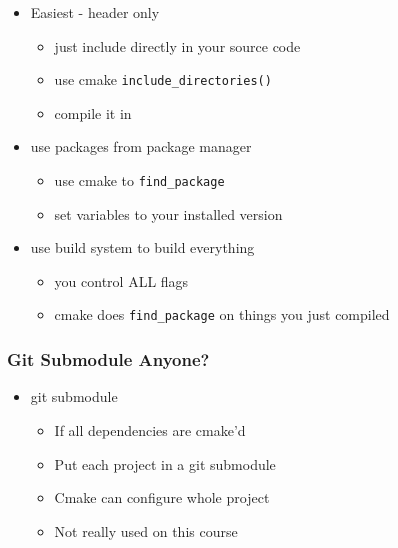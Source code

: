 \begin{itemize}
\itemsep1pt\parskip0pt
\item
  Easiest - header only

  \begin{itemize}
  \itemsep1pt\parskip0pt
  \item
    just include directly in your source code
  \item
    use cmake \texttt{include\_directories()}
  \item
    compile it in
  \end{itemize}
\item
  use packages from package manager

  \begin{itemize}
  \itemsep1pt\parskip0pt
  \item
    use cmake to \texttt{find\_package}
  \item
    set variables to your installed version
  \end{itemize}
\item
  use build system to build everything

  \begin{itemize}
  \itemsep1pt\parskip0pt
  \item
    you control ALL flags
  \item
    cmake does \texttt{find\_package} on things you just compiled
  \end{itemize}
\end{itemize}

\subsubsection{Git Submodule Anyone?}\label{git-submodule-anyone}

\begin{itemize}
\itemsep1pt\parskip0pt
\item
  git submodule

  \begin{itemize}
  \itemsep1pt\parskip0pt
  \item
    If all dependencies are cmake'd
  \item
    Put each project in a git submodule
  \item
    Cmake can configure whole project
  \item
    Not really used on this course
  \end{itemize}
\end{itemize}

